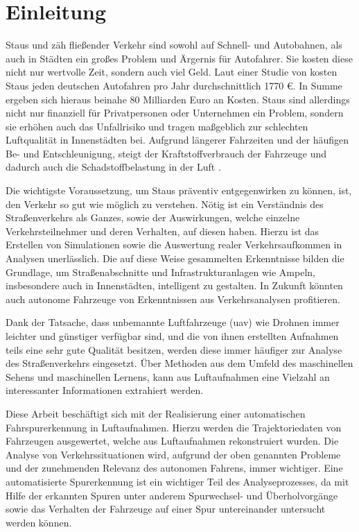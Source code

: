 
\chapter{Einleitung}
\label{cha:introduction}

Staus und zäh fließender Verkehr sind sowohl auf Schnell- und Autobahnen, als auch in Städten ein großes
Problem und Ärgernis für Autofahrer. Sie kosten diese nicht nur wertvolle Zeit, sondern auch viel Geld.
Laut einer Studie von \cite[]{Cookson} kosten Staus jeden deutschen Autofahren pro Jahr durchschnittlich 1770 €.
In Summe ergeben sich hieraus beinahe 80 Milliarden Euro an Kosten.
Staus sind allerdings nicht nur finanziell für Privatpersonen oder Unternehmen ein Problem,
sondern sie erhöhen auch das Unfallrisiko und tragen maßgeblich zur schlechten Luftqualität in Innenstädten bei.
Aufgrund längerer Fahrzeiten und der häufigen Be- und Entschleunigung, steigt der Kraftstoffverbrauch der
Fahrzeuge und dadurch auch die Schadstoffbelastung in der Luft \cite[]{Hemmerle2016}.

Die wichtigste Voraussetzung, um Staus präventiv entgegenwirken zu können, ist, den Verkehr so gut wie
möglich zu verstehen. Nötig ist ein Verständnis des Straßenverkehrs als Ganzes, sowie der Auswirkungen,
welche einzelne Verkehrsteilnehmer und deren Verhalten, auf diesen haben. Hierzu ist das Erstellen von
Simulationen sowie die Auswertung realer Verkehrsaufkommen in Analysen unerlässlich.
Die auf diese Weise gesammelten Erkenntnisse bilden die Grundlage, um Straßenabschnitte und Infrastrukturanlagen
wie Ampeln, insbesondere auch in Innenstädten, intelligent zu gestalten. In Zukunft könnten auch
autonome Fahrzeuge von Erkenntnissen aus Verkehrsanalysen profitieren.

Dank der Tatsache, dass unbemannte Luftfahrzeuge (\acrshort*{uav}) wie Drohnen immer leichter und günstiger
verfügbar sind, und die von ihnen erstellten Aufnahmen teils eine sehr gute Qualität besitzen, werden
diese immer häufiger zur Analyse des Straßenverkehrs eingesetzt. Über Methoden aus dem Umfeld des
maschinellen Sehens und maschinellen Lernens, kann aus Luftaufnahmen eine Vielzahl an interessanter
Informationen extrahiert werden.

Diese Arbeit beschäftigt sich mit der Realisierung einer automatischen Fahrspurerkennung in Luftaufnahmen.
Hierzu werden die Trajektoriedaten von Fahrzeugen ausgewertet, welche aus Luftaufnahmen rekonstruiert wurden.
Die Analyse von Verkehrssituationen wird, aufgrund der oben genannten Probleme und der zunehmenden Relevanz
des autonomen Fahrens, immer wichtiger.
Eine automatisierte Spurerkennung ist ein wichtiger Teil des Analyseprozesses, da mit Hilfe der
erkannten Spuren unter anderem Spurwechsel- und Überholvorgänge sowie das Verhalten der Fahrzeuge
auf einer Spur untereinander untersucht werden können.

